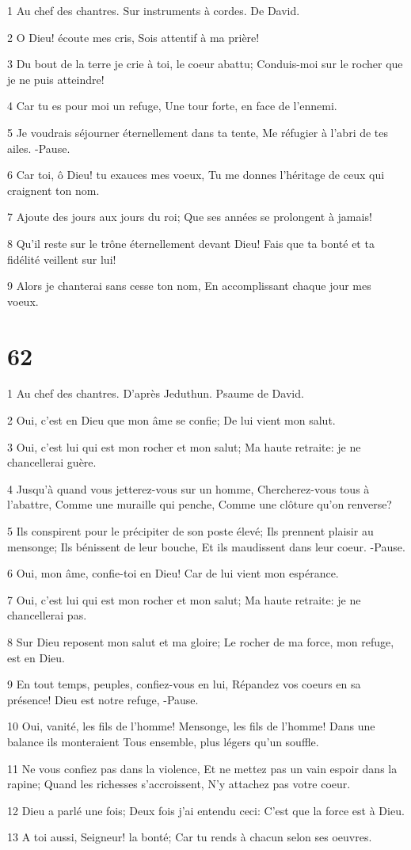 \par 1 Au chef des chantres. Sur instruments à cordes. De David.
\par 2 O Dieu! écoute mes cris, Sois attentif à ma prière!
\par 3 Du bout de la terre je crie à toi, le coeur abattu; Conduis-moi sur le rocher que je ne puis atteindre!
\par 4 Car tu es pour moi un refuge, Une tour forte, en face de l'ennemi.
\par 5 Je voudrais séjourner éternellement dans ta tente, Me réfugier à l'abri de tes ailes. -Pause.
\par 6 Car toi, ô Dieu! tu exauces mes voeux, Tu me donnes l'héritage de ceux qui craignent ton nom.
\par 7 Ajoute des jours aux jours du roi; Que ses années se prolongent à jamais!
\par 8 Qu'il reste sur le trône éternellement devant Dieu! Fais que ta bonté et ta fidélité veillent sur lui!
\par 9 Alors je chanterai sans cesse ton nom, En accomplissant chaque jour mes voeux.

\chapter{62}

\par 1 Au chef des chantres. D'après Jeduthun. Psaume de David.
\par 2 Oui, c'est en Dieu que mon âme se confie; De lui vient mon salut.
\par 3 Oui, c'est lui qui est mon rocher et mon salut; Ma haute retraite: je ne chancellerai guère.
\par 4 Jusqu'à quand vous jetterez-vous sur un homme, Chercherez-vous tous à l'abattre, Comme une muraille qui penche, Comme une clôture qu'on renverse?
\par 5 Ils conspirent pour le précipiter de son poste élevé; Ils prennent plaisir au mensonge; Ils bénissent de leur bouche, Et ils maudissent dans leur coeur. -Pause.
\par 6 Oui, mon âme, confie-toi en Dieu! Car de lui vient mon espérance.
\par 7 Oui, c'est lui qui est mon rocher et mon salut; Ma haute retraite: je ne chancellerai pas.
\par 8 Sur Dieu reposent mon salut et ma gloire; Le rocher de ma force, mon refuge, est en Dieu.
\par 9 En tout temps, peuples, confiez-vous en lui, Répandez vos coeurs en sa présence! Dieu est notre refuge, -Pause.
\par 10 Oui, vanité, les fils de l'homme! Mensonge, les fils de l'homme! Dans une balance ils monteraient Tous ensemble, plus légers qu'un souffle.
\par 11 Ne vous confiez pas dans la violence, Et ne mettez pas un vain espoir dans la rapine; Quand les richesses s'accroissent, N'y attachez pas votre coeur.
\par 12 Dieu a parlé une fois; Deux fois j'ai entendu ceci: C'est que la force est à Dieu.
\par 13 A toi aussi, Seigneur! la bonté; Car tu rends à chacun selon ses oeuvres.

